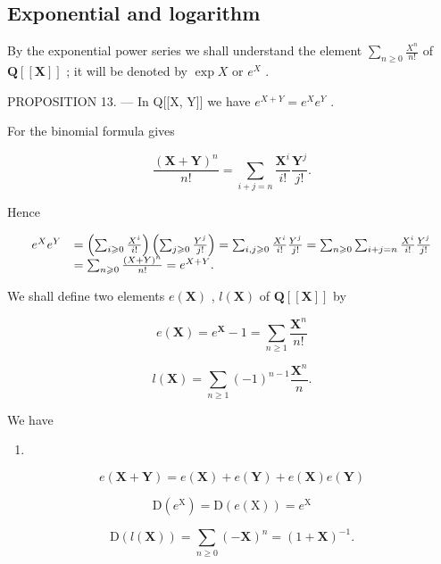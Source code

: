 \subsection{Exponential and logarithm}

By the exponential power series we shall understand the element \(\sum_{n\geqslant 0}\frac{X^n}{n!}\) of \(\mathbf{Q}[[\mathbf{X}]]\) ; it will be denoted by \(\exp X\) or \(e^X\) .

PROPOSITION 13. --- In Q{[}{[}X, Y{]}{]} we have \(e^{X + Y} = e^X e^Y\) .

For the binomial formula gives

\[
\frac {(\mathbf {X} + \mathbf {Y}) ^ {n}}{n !} = \sum_ {i + j = n} \frac {\mathbf {X} ^ {i}}{i !} \frac {\mathbf {Y} ^ {j}}{j !}.
\]

Hence

\[
\begin{array}{r l} e ^ {X} e ^ {Y} & = \left(\sum_ {i \geqslant 0} \frac {X ^ {i}}{i !}\right) \left(\sum_ {j \geqslant 0} \frac {Y ^ {j}}{j !}\right) = \sum_ {i, j \geqslant 0} \frac {X ^ {i}}{i !} \frac {Y ^ {j}}{j !} = \sum_ {n \geqslant 0} \sum_ {i + j = n} \frac {X ^ {i}}{i !} \frac {Y ^ {j}}{j !} \\ & = \sum_ {n \geqslant 0} \frac {(X + Y) ^ {n}}{n !} = e ^ {X + Y}. \end{array}
\]

We shall define two elements \(e(\mathbf{X})\) , \(l(\mathbf{X})\) of \(\mathbf{Q}[[\mathbf{X}]]\) by

\[
e (\mathbf {X}) = e ^ {\mathbf {X}} - 1 = \sum_ {n \geqslant 1} \frac {\mathbf {X} ^ {n}}{n !}\tag{33}
\]

\[
l (\mathbf {X}) = \sum_ {n \geqslant 1} (- 1) ^ {n - 1} \frac {\mathbf {X} ^ {n}}{n}.\tag{34}
\]

We have

\begin{enumerate}
\def\labelenumi{(\arabic{enumi})}
\setcounter{enumi}{34}
\tightlist
\item
\end{enumerate}

\[
e (\mathbf {X} + \mathbf {Y}) = e (\mathbf {X}) + e (\mathbf {Y}) + e (\mathbf {X}) e (\mathbf {Y})
\]

\[
\mathrm{D} (e ^ {\mathrm{X}}) = \mathrm{D} (e (\mathrm{X})) = e ^ {\mathrm{X}}\tag{36}
\]

\[
\mathrm{D} (l (\mathbf {X})) = \sum_ {n \geqslant 0} (- \mathbf {X}) ^ {n} = (1 + \mathbf {X}) ^ {- 1}.\tag{37}
\]


